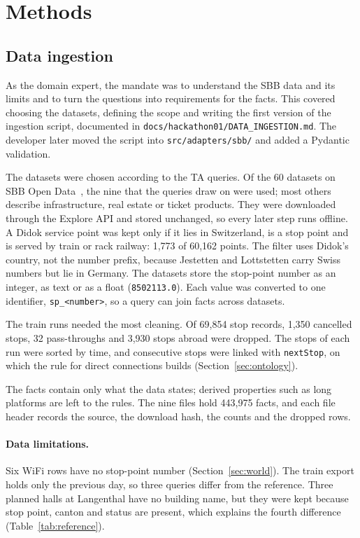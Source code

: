 \documentclass[10pt]{article}
\begin{document}
\section{Methods}
\label{sec:methods}

\subsection{Data ingestion}
\label{sec:ingestion}


As the domain expert, the mandate was to understand the SBB data and its limits and to turn the questions into requirements for the facts. This covered choosing the datasets, defining the scope and writing the first version of the ingestion script, documented in \texttt{docs/hackathon01/DATA\_INGESTION.md}. The developer later moved the script into \texttt{src/adapters/sbb/} and added a Pydantic validation.

The datasets were chosen according to the TA queries. Of the 60 datasets on SBB Open Data~\citep{sbbdata}, the nine that the queries draw on were used; most others describe infrastructure, real estate or ticket products. They were downloaded through the Explore API and stored unchanged, so every later step runs offline. A Didok service point was kept only if it lies in Switzerland, is a stop point and is served by train or rack railway: 1,773 of 60,162 points. The filter uses Didok's country, not the number prefix, because Jestetten and Lottstetten carry Swiss numbers but lie in Germany. The datasets store the stop-point number as an integer, as text or as a float (\texttt{8502113.0}). Each value was converted to one identifier, \texttt{sp\_<number>}, so a query can join facts across datasets.

The train runs needed the most cleaning. Of 69,854 stop records, 1,350 cancelled stops, 32 pass-throughs and 3,930 stops abroad were dropped. The stops of each run were sorted by time, and consecutive stops were linked with \texttt{nextStop}, on which the rule for direct connections builds (Section~\ref{sec:ontology}).

The facts contain only what the data states; derived properties such as long platforms are left to the rules. The nine files hold 443,975 facts, and each file header records the source, the download hash, the counts and the dropped rows.

\paragraph{Data limitations.}
Six WiFi rows have no stop-point number (Section~\ref{sec:world}). The train export holds only the previous day, so three queries differ from the reference. Three planned halls at Langenthal have no building name, but they were kept because stop point, canton and status are present, which explains the fourth difference (Table~\ref{tab:reference}).
\end{document}
